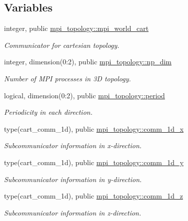 \subsection*{Variables}
\begin{DoxyCompactItemize}
\item 
integer, public \mbox{\hyperlink{namespacempi__topology_a2b10bc780ba4b14ea773c36f3e489a94}{mpi\+\_\+topology\+::mpi\+\_\+world\+\_\+cart}}
\begin{DoxyCompactList}\small\item\em Communicator for cartesian topology. \end{DoxyCompactList}\item 
integer, dimension(0\+:2), public \mbox{\hyperlink{namespacempi__topology_ac837e97cb4896a72d94eb7a9f12d6682}{mpi\+\_\+topology\+::np\+\_\+dim}}
\begin{DoxyCompactList}\small\item\em Number of M\+PI processes in 3D topology. \end{DoxyCompactList}\item 
logical, dimension(0\+:2), public \mbox{\hyperlink{namespacempi__topology_ac24cb383bdfbdf566165cf78b03677aa}{mpi\+\_\+topology\+::period}}
\begin{DoxyCompactList}\small\item\em Periodicity in each direction. \end{DoxyCompactList}\item 
type(cart\+\_\+comm\+\_\+1d), public \mbox{\hyperlink{namespacempi__topology_a4ef8d80f442649d77707d5ebeeefa391}{mpi\+\_\+topology\+::comm\+\_\+1d\+\_\+x}}
\begin{DoxyCompactList}\small\item\em Subcommunicator information in x-\/direction. \end{DoxyCompactList}\item 
type(cart\+\_\+comm\+\_\+1d), public \mbox{\hyperlink{namespacempi__topology_ad48a88602b9b9950200733823f95b5d0}{mpi\+\_\+topology\+::comm\+\_\+1d\+\_\+y}}
\begin{DoxyCompactList}\small\item\em Subcommunicator information in y-\/direction. \end{DoxyCompactList}\item 
type(cart\+\_\+comm\+\_\+1d), public \mbox{\hyperlink{namespacempi__topology_aed5c66dd4697b116c53db4613ad802ce}{mpi\+\_\+topology\+::comm\+\_\+1d\+\_\+z}}
\begin{DoxyCompactList}\small\item\em Subcommunicator information in z-\/direction. \end{DoxyCompactList}\end{DoxyCompactItemize}


